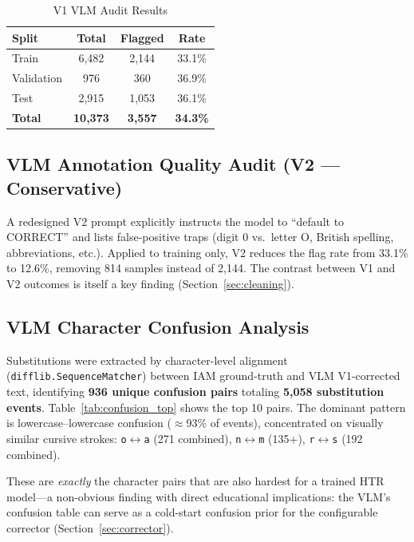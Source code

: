 \documentclass[conference]{IEEEtran}
\begin{document}
\begin{table}[h]
\centering
\caption{V1 VLM Audit Results}
\label{tab:v1audit}
\begin{tabular}{@{}lccc@{}}
\toprule
\textbf{Split} & \textbf{Total} & \textbf{Flagged} & \textbf{Rate} \\
\midrule
Train      & 6,482  & 2,144 & 33.1\% \\
Validation & 976    & 360   & 36.9\% \\
Test       & 2,915  & 1,053 & 36.1\% \\
\midrule
\textbf{Total} & \textbf{10,373} & \textbf{3,557} & \textbf{34.3\%} \\
\bottomrule
\end{tabular}
\end{table}

\subsection{VLM Annotation Quality Audit (V2 --- Conservative)}

A redesigned V2 prompt explicitly instructs the model to ``default to CORRECT'' and lists false-positive traps (digit 0 vs.\ letter O, British spelling, abbreviations, etc.). Applied to training only, V2 reduces the flag rate from 33.1\% to 12.6\%, removing 814 samples instead of 2,144. The contrast between V1 and V2 outcomes is itself a key finding (Section~\ref{sec:cleaning}).

\subsection{VLM Character Confusion Analysis}

Substitutions were extracted by character-level alignment (\texttt{difflib.SequenceMatcher}) between IAM ground-truth and VLM V1-corrected text, identifying \textbf{936 unique confusion pairs} totaling \textbf{5,058 substitution events}. Table~\ref{tab:confusion_top} shows the top 10 pairs. The dominant pattern is lowercase--lowercase confusion ($\approx$93\% of events), concentrated on visually similar cursive strokes: \texttt{o}$\leftrightarrow$\texttt{a} (271 combined), \texttt{n}$\leftrightarrow$\texttt{m} (135+), \texttt{r}$\leftrightarrow$\texttt{s} (192 combined).

These are \emph{exactly} the character pairs that are also hardest for a trained HTR model---a non-obvious finding with direct educational implications: the VLM's confusion table can serve as a cold-start confusion prior for the configurable corrector (Section~\ref{sec:corrector}).
\end{document}
